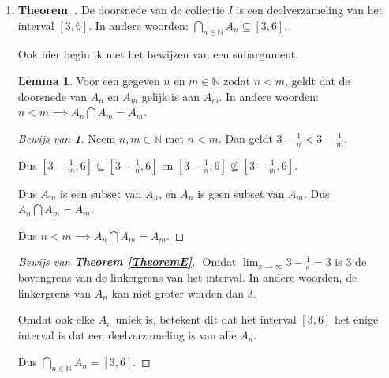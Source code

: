 \documentclass[12pt, dutch, a4paper]{article}
\theoremstyle{definition}
\newtheorem{lemma}{Lemma}[theorem]
\newenvironment{shortthm}
  {\refstepcounter{theorem}\textbf{Theorem~\thetheorem.}}%
{\enskip}
\begin{document}
\begin{enumerate}[(a.)]
    \item 
    \begin{shortthm} \label{TheoremE}
        De doorsnede van de collectie $I$ is een deelverzameling van het interval $[3,6]$.
        In andere woorden: $\bigcap_{n \in \mathbb{N}}A_n \subseteq [3,6]$.
    \end{shortthm}

    Ook hier begin ik met het bewijzen van een subargument.

    \begin{lemma} \label{LemmaE}
        Voor een gegeven $n$ en $m \in \mathbb{N}$ zodat $n < m$, 
        geldt dat de doorsnede van $A_n$ en $A_m$ gelijk is aan $A_m$.  
        In andere woorden: \newline
        $n < m \implies A_n \bigcap A_m = A_m$.
    \end{lemma}

    \begin{proof}[Bewijs van \textbf{\cref{LemmaE}}]
        Neem $n,m \in \mathbb{N}$ met $n < m$. \newline
        Dan geldt $3 - \frac{1}{n} < 3 - \frac{1}{m}$.

        Dus $[3 - \frac{1}{m}, 6] \subseteq [3 - \frac{1}{n}, 6]$ en 
        $[3 - \frac{1}{n}, 6] \nsubseteq [3 - \frac{1}{m}, 6]$.

        Dus $A_m$ is een subset van $A_n$, en $A_n$ is geen subset van $A_m$. \newline
        Dus $A_n \bigcap A_m = A_m$.

        Dus $n < m \implies A_n \bigcap A_m = A_m$. \newline
    \end{proof}
    \bigskip

    \begin{proof}[Bewijs van \textbf{Theorem \ref{TheoremE}}] $ $ \newline
        Omdat $\lim_{x\to\infty} 3-\tfrac{1}{a} = 3$ 
        is 3 de bovengrens van de linkergrens van het interval. In andere woorden,
        de linkergrens van $A_n$ kan niet groter worden dan 3.

        Omdat ook elke $A_n$ uniek is, 
        betekent dit dat het interval $[3,6]$ het enige interval is 
        dat een deelverzameling is van alle $A_n$.

        Dus $\bigcap_{n \in \mathbb{N}}A_n = [3,6]$. \newline
    \end{proof}
\end{enumerate}
\end{document}
